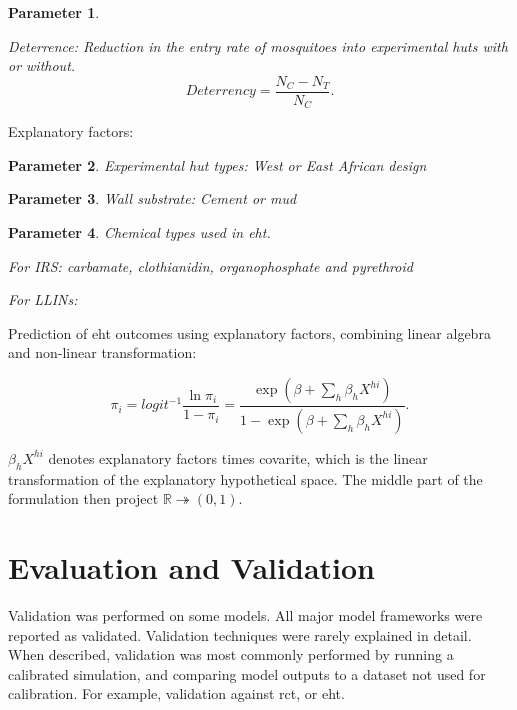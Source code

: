 \documentclass[a4paper, 12pt, twoside]{article}
\newtheorem{parameter}{Parameter}
\begin{document}
\begin{parameter}
	\label{eht:Deterrence}

	Deterrence: Reduction in the entry rate of mosquitoes into experimental huts with or without.
	\[
		Deterrency = \frac{N_C - N_T}{N_C}
		.\]
\end{parameter}

Explanatory factors:

\begin{parameter}
	\label{eht:experimental_hut_types}
	Experimental hut types: West or East African design

\end{parameter}

\begin{parameter}
	\label{eht:wall_substrate}
	Wall substrate: Cement or mud

\end{parameter}

\begin{parameter}
	\label{eht:chemical_class_used}
	Chemical types used in \gls{eht}.

	For IRS: carbamate, clothianidin, organophosphate and pyrethroid

	For LLINs:

\end{parameter}

Prediction of \gls{eht} outcomes using explanatory factors, combining linear algebra and non-linear transformation\cite{Sherrard-Smith2018b}:

\[
	\pi_i = logit^{-1} \frac{\ln \pi_i}{1-\pi_i} = \frac{ \exp( \beta + \sum_h \beta_h X^{hi} ) }{ 1 - \exp( \beta + \sum_h \beta_h X^{hi} ) }
	.\]

$\beta_h X^{hi}$ denotes explanatory factors times covarite, which is the linear transformation of the explanatory hypothetical space. The middle part of the formulation then project $\mathbb{R} \twoheadrightarrow (0,1)$.

\section{Evaluation and Validation}
Validation was performed on some models.
All major model frameworks were reported as validated.
Validation techniques were rarely explained in detail.
When described, validation was most commonly performed by running a calibrated simulation, and comparing model outputs to a dataset not used for calibration.
For example, validation against \gls{rct}, or \gls{eht}.
\end{document}
